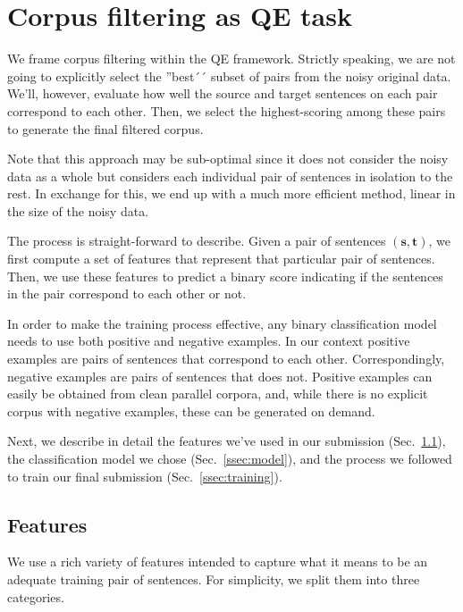 \section{Corpus filtering as QE task}

We frame corpus filtering within the QE framework. Strictly speaking, we are not going to explicitly select the ''best´´ subset of pairs from the noisy original data. We'll, however, evaluate how well the source and target sentences on each pair correspond to each other. Then, we select the highest-scoring among these pairs to generate the final filtered corpus.

Note that this approach may be sub-optimal since it does not consider the noisy data as a whole but considers each individual pair of sentences in isolation to the rest. In exchange for this, we end up with a much more efficient method, linear in the size of the noisy data.

The process is straight-forward to describe. Given a pair of sentences $(\mathbf{s}, \mathbf{t})$, we first compute a set of features that represent that particular pair of sentences. Then, we use these features to predict a binary score indicating if the sentences in the pair correspond to each other or not. 

In order to make the training process effective, any binary classification model needs to use both positive and negative examples. In our context positive examples are pairs of sentences that correspond to each other. Correspondingly, negative examples are pairs of sentences that does not. Positive examples can easily be obtained from clean parallel corpora, and, while there is no explicit corpus with negative examples, these can be generated on demand. 

Next, we describe in detail the features we've used in our submission (Sec.~\ref{ssec:features}), the classification model we chose (Sec.~\ref{ssec:model}), and the process we followed to train our final submission (Sec.~\ref{ssec:training}).


\subsection{Features}
\label{ssec:features}

We use a rich variety of features intended to capture what it means to be an adequate training pair of sentences. For simplicity, we split them into three categories.

